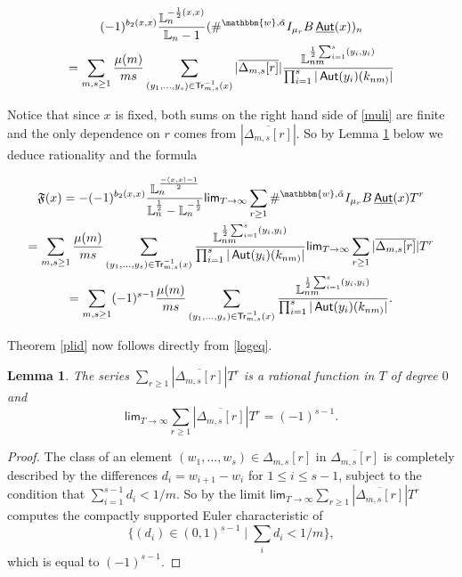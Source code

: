 \documentclass{article}
\newcommand{\MF}{\mathfrak{F}}
\renewcommand{\lim}{\mathsf{lim}}
\DeclareMathOperator{\Aut}{\mathsf{Aut}}
\DeclareMathOperator{\uAut}{\underline{\mathsf{Aut}}}
\DeclareMathOperator{\Tr}{\mathsf{Tr}}
\newcommand{\BL}{{\mathbb{L}}}
\newcommand{\Bw}{\mathbbm{w}}
\theoremstyle{definition}
\theoremstyle{plain}
\newtheorem{lemma}[definition]{Lemma}
\begin{document}
    
    \begin{multline}\label{muli}
       (-1)^{b_2(x,x)} \frac{\BL_n^{-\frac{1}{2}(x,x)}}{\BL_n-1} (\#^{\Bw,\tilde\alpha} I_{\mu_r}B\uAut(x))_n  \\ =
          \sum_{m,s \geq 1}  \frac{\mu(m)}{ms} \sum_{(y_1,\hdots,y_s) \in \Tr^{-1}_{m,s}(x)}  |\overline{\Delta_{m,s}[r]}|  \frac{\BL_{nm}^{\frac{1}{2}\sum_{i=1}^s (y_i,y_i)}}{\prod_{i=1}^s |\Aut(y_i)(k_{nm)}|} 
    \end{multline}

Notice that since $x$ is fixed, both sums on the right hand side of \eqref{muli} are finite and the only dependence on $r$ comes from $|\overline{\Delta_{m,s}[r]}|$. So by Lemma \ref{esch} below we deduce rationality and the formula

    
    \begin{multline*}
       \MF(x) =  -(-1)^{b_2(x,x)} \frac{\BL_n^{\frac{-(x,x)-1}{2}}}{\BL^{\frac{1}{2}}_n-\BL^{-\frac{1}{2}}_n} \lim_{T\to \infty}\sum_{r \geq 1}  \#^{\Bw,\tilde\alpha} I_{\mu_r}B\uAut(x) T^r  \\
       = \sum_{m,s \geq 1} \frac{\mu(m)}{ms} \sum_{(y_1,\hdots,y_s) \in \Tr^{-1}_{m,s}(x)}  \frac{\BL_{nm}^{\frac{1}{2}\sum_{i=1}^s (y_i,y_i)}}{\prod_{i=1}^s |\Aut(y_i)(k_{nm)}|} \lim_{T\to \infty}\sum_{r \geq 1}  |\overline{\Delta_{m,s}[r]}| T^r\\
        = \sum_{m,s \geq 1}(-1)^{s-1} \frac{\mu(m)}{ms} \sum_{(y_1,\hdots,y_s) \in \Tr^{-1}_{m,s}(x)}  \frac{\BL_{nm}^{\frac{1}{2}\sum_{i=1}^s (y_i,y_i)}}{\prod_{i=1}^s |\Aut(y_i)(k_{nm)}|}.
    \end{multline*}

Theorem \ref{plid} now follows directly from \eqref{logeq}.

    \begin{lemma}\label{esch}
The series $\sum_{r \geq 1} |\overline{\Delta_{m,s}[r]}| T^r$ is a rational function in $T$ of degree $0$ and
       \[ \lim_{T\to \infty}\sum_{r \geq 1} |\overline{\Delta_{m,s}[r]}| T^r=(-1)^{s-1}.\]
    \end{lemma}
\begin{proof}
    The class of an element $(w_1,\hdots,w_s) \in \Delta_{m,s}[r]$ in $\overline{\Delta_{m,s}[r]}$ is completely described by the differences $d_i=w_{i+1}-w_i$ for $1\leq i \leq s-1$, subject to the condition that $\sum_{i=1}^{s-1}d_i < 1/m$. So by \cite[Lemma 8.5.2]{HL15} the limit $ \lim_{T\to \infty}\sum_{r \geq 1} |\overline{\Delta_{m,s}[r]}| T^r$ computes the compactly supported Euler characteristic of 
    \begin{equation*}
        \{(d_i) \in (0,1)^{s-1} \mid \sum_i d_i < 1/m \},
    \end{equation*}
    which is equal to $(-1)^{s-1}$.
\end{proof}
\end{document}
